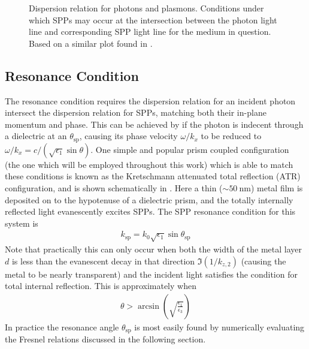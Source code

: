 \documentclass[a4paper,titlepage,onecolumn]{report}
\begin{document}
\begin{figure}[ht]
\caption{Dispersion relation for photons and plasmons.  Conditions under
which SPPs may occur at the intersection between the photon light line and
corresponding SPP light line for the medium in question.  Based on a
similar plot found in \cite{shsongspp}.}
\label{fig:dispersionrelation}
\end{figure}
\subsection{Resonance Condition}
The resonance condition requires the dispersion relation for an
incident photon intersect the dispersion relation for SPPs, matching both
their in-plane momentum and phase.  This can be achieved by if the photon
is indecent through a dielectric at an $\theta_\text{sp}$, causing its phase
velocity $\omega/k_x$ to be reduced to  $\omega/k_x = c/(\sqrt{\epsilon_1}
\sin \theta)$.  One simple and popular prism coupled configuration (the one
which will be employed throughout this work) which is able to match these
conditions is known as the Kretschmann attenuated total reflection (ATR)
configuration, and is shown schematically in .
Here a thin ($\sim \SI{50}{\nano\meter}$) metal film is deposited on to the
hypotenuse of a dielectric prism, and the totally internally reflected
light evanescently excites SPPs.  The SPP resonance condition for this
system is
\begin{align}
k_\text{sp}=k_0 \sqrt{\epsilon_1} \sin \theta_\text{sp} 
\end{align}
Note that practically this can only occur when both the width of the metal
layer $d$ is less than the evanescent decay in that direction
$\Im(1/k_{z,2})$ (causing the metal to be nearly transparent) and the
incident light satisfies the condition for total internal reflection.  This 
is approximately when
\begin{align}
\theta>\arcsin\left(\sqrt{\frac{\epsilon_1}{\epsilon_3}}\right)
\end{align} 
In practice the resonance angle $\theta_\text{sp}$ is most easily found by
numerically evaluating the Fresnel relations discussed in the following
section.
\end{document}
